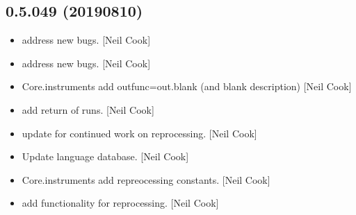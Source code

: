 \documentclass[a4paper,10pt,english]{report}
\begin{document}
\subsection{0.5.049 (2019\sphinxhyphen{}08\sphinxhyphen{}10)}
\label{\detokenize{misc/changelog:id112}}\begin{itemize}
\item {} 
 \sphinxhyphen{} address new bugs. {[}Neil Cook{]}

\item {} 
 \sphinxhyphen{} address new bugs. {[}Neil Cook{]}

\item {} 
Core.instruments \sphinxhyphen{} add outfunc=out.blank (and blank description) {[}Neil
Cook{]}

\item {} 
 \sphinxhyphen{} add return of runs. {[}Neil Cook{]}

\item {} 
 \sphinxhyphen{} update for continued work on reprocessing. {[}Neil
Cook{]}

\item {} 
Update language database. {[}Neil Cook{]}

\item {} 
Core.instruments \sphinxhyphen{} add repreocessing constants. {[}Neil Cook{]}

\item {} 
 \sphinxhyphen{} add functionality for reprocessing. {[}Neil Cook{]}

\end{itemize}
\end{document}
